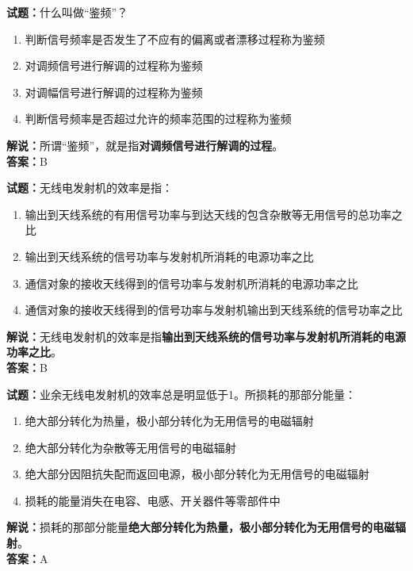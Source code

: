 \documentclass{ctexbook}
\begin{document}
\bigskip

\noindent\textbf{试题：}什么叫做“鉴频”？

\begin{enumerate}[leftmargin=3em]
  \item 判断信号频率是否发生了不应有的偏离或者漂移过程称为鉴频
  \item 对调频信号进行解调的过程称为鉴频
  \item 对调幅信号进行解调的过程称为鉴频
  \item 判断信号频率是否超过允许的频率范围的过程称为鉴频
\end{enumerate}

\noindent\textbf{解说：}所谓“鉴频”，就是指\textbf{对调频信号进行解调的过程}。\\\noindent\textbf{答案：}B

\bigskip

\noindent\textbf{试题：}无线电发射机的效率是指：

\begin{enumerate}[leftmargin=3em]
  \item 输出到天线系统的有用信号功率与到达天线的包含杂散等无用信号的总功率之比
  \item 输出到天线系统的信号功率与发射机所消耗的电源功率之比
  \item 通信对象的接收天线得到的信号功率与发射机所消耗的电源功率之比
  \item 通信对象的接收天线得到的信号功率与发射机输出到天线系统的信号功率之比
\end{enumerate}

\noindent\textbf{解说：}无线电发射机的效率是指\textbf{输出到天线系统的信号功率与发射机所消耗的电源功率之比}。\\\noindent\textbf{答案：}B%

\bigskip

\noindent\textbf{试题：}业余无线电发射机的效率总是明显低于1。所损耗的那部分能量：

\begin{enumerate}[leftmargin=3em]
  \item 绝大部分转化为热量，极小部分转化为无用信号的电磁辐射
  \item 绝大部分转化为杂散等无用信号的电磁辐射
  \item 绝大部分因阻抗失配而返回电源，极小部分转化为无用信号的电磁辐射
  \item 损耗的能量消失在电容、电感、开关器件等零部件中
\end{enumerate}

\noindent\textbf{解说：}损耗的那部分能量\textbf{绝大部分转化为热量，极小部分转化为无用信号的电磁辐射}。\\\noindent\textbf{答案：}A%
\end{document}
